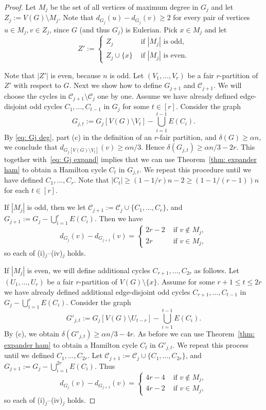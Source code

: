 \documentclass[a4paper, 11pt, reqno]{amsart}
\numberwithin{equation}{section}
\newcommand{\1}{{\rm 1\hspace*{-0.4ex}%
\rule{0.1ex}{1.52ex}\hspace*{0.2ex}}}
\newcommand{\cC}{\mathcal{C}}
\newcommand{\sm}{\setminus}
\begin{document}
\begin{proof}
Let $M_j$ be the set of all vertices of maximum degree in $G_j$ and let $Z_j:=V(G)\sm M_j$. 
Note that $d_{G_j}(u) - d_{G_j}(v)\geq 2$ for every pair of vertices $u\in M_j, v\in Z_j$, 
since $G$ (and thus $G_j$) is Eulerian. Pick $x\in M_j$ and let 
$$Z':= \left\{\begin{array}{ll} 
Z_j & \text{ if } |M_j| \text{ is odd,}\\
Z_j\cup \{x\} &\text{ if } |M_j| \text{ is even.}
 \end{array} \right.$$

Note that $|Z'|$ is even, because $n$ is odd. 
Let $(V_1,\dots, V_r)$ be a fair $r$-partition of $Z'$ with respect to $G$.  Next we show how to define $G_{j+1}$ and $\cC_{j+1}$.
We will choose the cycles in $\cC_{j+1}\sm \cC_j$ one by one. 
Assume we have already defined edge-disjoint odd cycles $C_1,\dots, C_{t-1}$  in $G_j$ for some $t\in [r]$.
Consider the graph
$$G_{j,t}:= G_j[ V(G)\setminus V_{t}] - \bigcup_{i=1}^{t-1} E(C_i).$$ 
By \eqref{eq: Gj deg}, part (c) in the definition of an $r$-fair partition, and $\delta(G)\geq \alpha n$, we conclude that $d_{G_j[V(G)\setminus V_{t}]}(v) \geq \alpha n/3$.
Hence $\delta(G_{j,t})\geq \alpha n/3-2r$. 
This together with~\eqref{eq: Gj expand} implies that we can use Theorem~\ref{thm: expander ham} to obtain a Hamilton cycle $C_{t}$ in $G_{j,t}$.
We repeat this procedure until we have defined $C_1,\dots, C_r$. Note that $|C_t|\geq (1-1/r)n-2 \geq (1- 1/(r-1))n$ for each $t\in [r]$.

If $|M_j|$ is odd, then we let $\cC_{j+1}:= \cC_j \cup \{C_1,\dots, C_{r}\}$, and $G_{j+1}:= G_j - \bigcup_{i=1}^{r} E(C_i)$. 
Then we have
$$d_{G_j}(v)-d_{G_{j+1}}(v) = \left\{ \begin{array}{ll}
2r-2 & \text{ if } v\notin M_j, \\
2r & \text{ if } v\in M_j,
  \end{array} \right.$$
so each of (i)$_j$--(iv)$_j$ holds. 

If $|M_j|$ is even, we will define additional cycles $C_{r+1},\dots, C_{2r}$ as follows. Let $(U_1,\dots, U_r)$ be a fair $r$-partition of $V(G)\setminus \{x\}$.
Assume for some $r+1\leq t\leq 2r$ we have already defined additional edge-disjoint odd cycles $C_{r+1},\dots, C_{t-1}$ in $G_j-\bigcup_{i=1}^{r} E(C_i)$.
Consider the graph
$$G'_{j,t}:=G_j[ V(G)\setminus U_{t-r}] - \bigcup_{i=1}^{t-1} E(C_i).$$ 
By (c), we obtain $\delta(G'_{j,t})\geq \alpha n/3-4r$.
As before we can use Theorem~\ref{thm: expander ham} to obtain a Hamilton cycle $C_{t}$ in $G'_{j,t}$. 
We repeat this process until we defined $C_1,\dots, C_{2r}$. 
Let $\cC_{j+1}:= \cC_j \cup \{C_1,\dots, C_{2r}\}$, and $G_{j+1}:= G_j - \bigcup_{i=1}^{2r} E(C_i)$. 
Thus
$$d_{G_j}(v)-d_{G_{j+1}}(v) = \left\{ \begin{array}{ll}
4r-4 & \text{ if } v\notin M_j, \\
4r-2 & \text{ if } v\in M_j,
  \end{array} \right.$$
so each of (i)$_j$--(iv)$_j$ holds. 


\end{proof}
\end{document}
